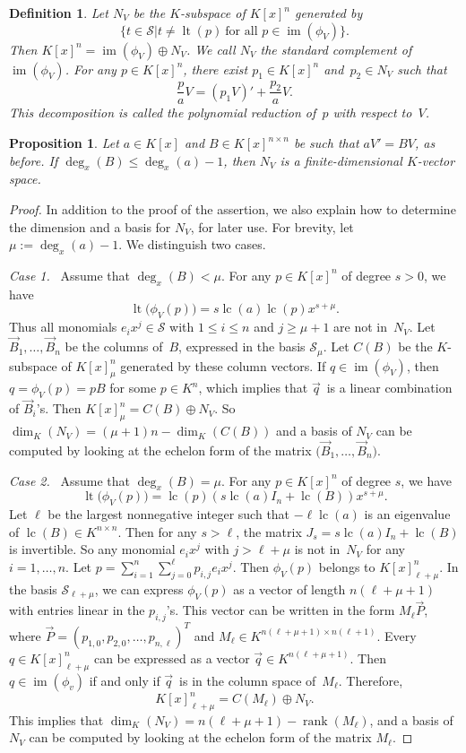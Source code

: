 \documentclass{sig-alternate-05-2015}
\newtheorem{prop}[theorem]{Proposition}
\newtheorem{defi}[theorem]{Definition}
\newcommand{\cS}{ {\mathcal S}}
\def\lc{\operatorname{lc}}
\def\rank{\operatorname{rank}}
\def\lt{\operatorname{lt}}
\def\im{\operatorname{im}}
\begin{document}
\begin{defi}
Let $N_V$ be the $K$-subspace of $K[x]^n$ generated by
\[
  \bigl\{t \in \cS \mathrel{\big|} t \neq \lt(p) \ \text{for all $p\in \im(\phi_V)$}\bigr\}.
\]
Then $K[x]^n = \im(\phi_V) \oplus N_V$.
We call $N_V$ the \emph{standard complement} of $\im(\phi_V)$.
For any $p\in K[x]^n$, there exist $p_1\in K[x]^n$ and~$p_2\in N_V$ such that
\[\frac{p}{a}V = (p_1V)' + \frac{p_2}{a}V.\]
This decomposition is called the \emph{polynomial reduction} of~$p$
with respect to~$V$.
\end{defi}

\begin{prop}\label{PROP:finite}
Let $a\in K[x]$ and $B\in K[x]^{n \times n}$ be such that $aV'=BV$, as before.
If $\deg_x(B) \leq \deg_x(a)-1$, then $N_V$ is a finite-dimensional
$K$-vector space.
\end{prop}
\begin{proof}
In addition to the proof of the assertion, we also explain how to determine
the dimension and a basis for $N_V$, for later use. For brevity, let
$\mu:=\deg_x(a)-1$. We distinguish two cases.

\smallskip
{\it Case 1.}~
Assume that $\deg_x(B) < \mu$. For any $p\in K[x]^n$ of degree $s>0$, we have
\[
  \lt\bigl(\phi_V(p)\bigr) = s\lc(a)\lc(p)x^{s+\mu}.
\]
Thus all monomials $e_i x^j\in \cS$ with $1\leq i\leq n$ and $j\geq \mu+1$ are not in~$N_V$.
Let $\vec{B}_1, \ldots, \vec{B}_n$ be the columns of~$B$, expressed in the basis $\cS_\mu$.
Let $C(B)$ be the $K$-subspace of $K[x]_\mu^n$ generated by these column vectors.
If $q\in \im(\phi_V)$, then $q = \phi_V(p) = pB$ for some $p \in K^n$, which implies that
$\vec{q}\,$ is a linear combination of $\vec{B}_i$'s. Then $K[x]_\mu^n = C(B) \oplus N_V$.
So $\dim_K(N_V)= (\mu+1)n - \dim_K(C(B))$ and a basis of $N_V$ can be computed by
looking at the echelon form of the matrix $\bigl(\vec{B}_1, \ldots, \vec{B}_n\bigr)$.

\smallskip
{\it Case 2.}~
Assume that $\deg_x(B) =\mu$. For any $p\in K[x]^n$ of degree $s$, we have
\[
  \lt\bigl(\phi_V(p)\bigr) = \lc(p)(s\lc(a)I_n + \lc(B))x^{s+\mu}.
\]
Let $\ell$ be the largest nonnegative integer such that $-\ell \lc(a)$ is an
eigenvalue of $\lc(B)\in K^{n\times n}$. Then for any $s>\ell$,
the matrix $J_s = s\lc(a)I_n + \lc(B)$ is invertible. So any monomial $e_ix^j$ with $j> \ell+\mu$ is not in~$N_V$
for any $i=1, \ldots, n$. Let $p = \sum_{i=1}^n \sum_{j=0}^{\ell} p_{i, j} e_ix^j$.
Then $\phi_V(p)$ belongs to $K[x]_{\ell+\mu}^n$.
In the basis $\cS_{\ell+\mu}$, we can
express $\phi_V(p)$ as a vector of length ${n(\ell+\mu+1)}$ with entries linear in the $p_{i, j}$'s.
This vector can be written in the form $M_{\ell} \vec{P}$,
where $\vec{P} = (p_{1, 0}, p_{2, 0}, \ldots, p_{n, \ell})^T$ and $M_{\ell} \in K^{n(\ell+\mu +1) \times n(\ell+1)}$.
Every $q\in K[x]_{\ell+\mu}^n$ can be expressed as a vector $\vec{q} \in K^{n(\ell + \mu +1)}$.
Then $q\in\im(\phi_v)$ if and only if $\vec{q}\,$ is in the column space of~$M_{\ell}$.
Therefore,
\[K[x]_{\ell+\mu}^n = C({M_{\ell}}) \oplus N_V. \]
This implies that $\dim_K(N_V) = n(\ell+\mu+1) - \rank({M_{\ell}})$, and
a basis of $N_V$ can be computed by
looking at the echelon form of the matrix ${M_{\ell}}$.
\end{proof}
\end{document}
